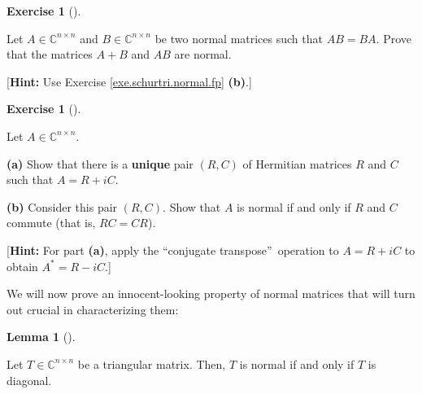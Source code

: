 \documentclass[numbers=enddot,12pt,final,onecolumn,notitlepage]{scrartcl}%
\newcounter{exer}
\numberwithin{exer}{subsection}
\theoremstyle{definition}
\newtheorem{lem}[theo]{Lemma}
\newenvironment{lemma}[1][]
{\begin{lem}[#1]\begin{leftbar}}
{\end{leftbar}\end{lem}}
\newtheorem{exmp}[exer]{Exercise}
\newenvironment{exercise}[1][]
{\begin{exmp}[#1]\begin{leftbar}}
{\end{leftbar}\end{exmp}}
\begin{document}
\begin{exercise}
 Let $A\in\mathbb{C}^{n\times n}$ and $B\in\mathbb{C}^{n\times n}$ be
two normal matrices such that $AB=BA$. Prove that the matrices $A+B$ and $AB$
are normal. \medskip

[\textbf{Hint:} Use Exercise \ref{exe.schurtri.normal.fp} \textbf{(b)}.]
\end{exercise}

\begin{exercise}
 Let $A\in\mathbb{C}^{n\times n}$. \medskip

\textbf{(a)} Show that there is a \textbf{unique} pair $\left(  R,C\right)  $
of Hermitian matrices $R$ and $C$ such that $A=R+iC$. \medskip

\textbf{(b)} Consider this pair $\left(  R,C\right)  $. Show that $A$ is
normal if and only if $R$ and $C$ commute (that is, $RC=CR$). \medskip

[\textbf{Hint:} For part \textbf{(a)}, apply the \textquotedblleft conjugate
transpose\textquotedblright\ operation to $A=R+iC$ to obtain $A^{\ast}=R-iC$.]
\end{exercise}

We will now prove an innocent-looking property of normal matrices that will
turn out crucial in characterizing them:

\begin{lemma}
\label{lem.schurtri.normal.tri}Let $T\in\mathbb{C}^{n\times n}$ be a
triangular matrix. Then, $T$ is normal if and only if $T$ is diagonal.
\end{lemma}
\end{document}
